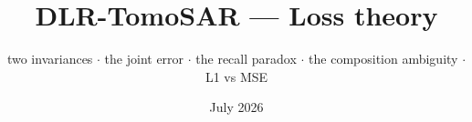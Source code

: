 \documentclass[aspectratio=169,9pt]{beamer}
\title{\textbf{DLR-TomoSAR --- Loss theory}}
\subtitle{two invariances \; $\cdot$ \; the joint error \; $\cdot$ \; the recall paradox \; $\cdot$ \; the composition ambiguity \; $\cdot$ \; L1 vs MSE}
\date{\small July 2026}
\author{}
\begin{document}
\begin{frame}[plain]
  \titlepage
\end{frame}




\end{document}
